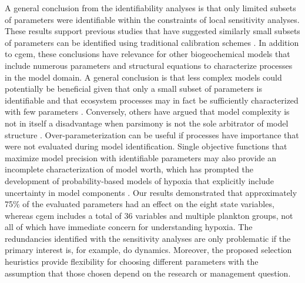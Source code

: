 \documentclass[preprint]{elsarticle}\usepackage[]{graphicx}\usepackage[]{color}
\begin{document}
A general conclusion from the identifiability analyses is that only limited subsets of parameters were identifiable within the constraints of local sensitivity analyses. These results support previous studies that have suggested similarly small subsets of parameters can be identified using traditional calibration schemes \citep[e.g.,][]{Wheater86,Ye97,Omlin01}.  In addition to \ac{cgem}, these conclusions have relevance for other biogeochemical models that include numerous parameters and structural equations to characterize processes in the model domain.  A general conclusion is that less complex models could potentially be beneficial given that only a small subset of parameters is identifiable and that ecosystem processes may in fact be sufficiently characterized with few parameters \citep{Ye97}.  Conversely, others have argued that model complexity is not in itself a disadvantage when parsimony is not the sole arbitrator of model structure \citep{Reichert97}. Over-parameterization can be useful if processes have importance that were not evaluated during model identification.  Single objective functions that maximize model precision with identifiable parameters may also provide an incomplete characterization of model worth, which has prompted the development of probability-based models of hypoxia that explicitly include uncertainty in model components \citep[e.g.][]{Obenour15}.  Our results demonstrated that approximately 75\% of the evaluated parameters had an effect on the eight state variables, whereas \ac{cgem} includes a total of 36 variables and multiple plankton groups, not all of which have immediate concern for understanding hypoxia. The redundancies identified with the sensitivity analyses are only problematic if the primary interest is, for example, \ac{do} dynamics.  Moreover, the proposed selection heuristics provide flexibility for choosing different parameters with the assumption that those chosen depend on the research or management question. 
\end{document}
